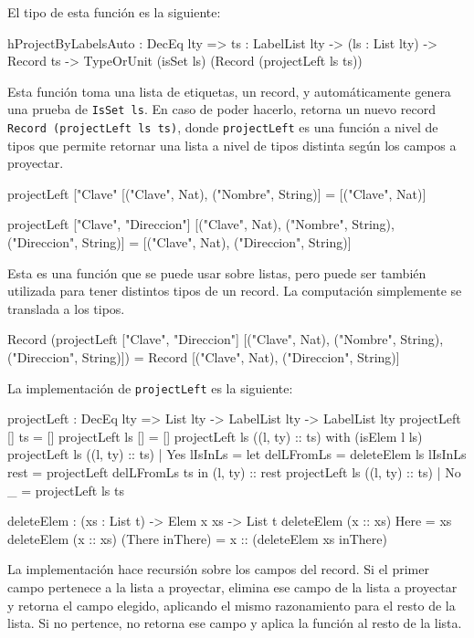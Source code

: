 El tipo de esta función es la siguiente:

\begin{code}
hProjectByLabelsAuto : DecEq lty => {ts : LabelList lty} ->
  (ls : List lty) -> Record ts ->
  TypeOrUnit (isSet ls) (Record (projectLeft ls ts))
\end{code}

Esta función toma una lista de etiquetas, un record, y automáticamente genera una prueba de \texttt{IsSet ls}. En caso de poder hacerlo, retorna un nuevo record \texttt{Record (projectLeft ls ts)}, donde \texttt{projectLeft} es una función a nivel de tipos que permite retornar una lista a nivel de tipos distinta según los campos a proyectar.

\begin{code}
projectLeft ["Clave"
  [("Clave", Nat), ("Nombre", String)] =
  [("Clave", Nat)]

projectLeft ["Clave", "Direccion"]
  [("Clave", Nat), ("Nombre", String), ("Direccion", String)] =
  [("Clave", Nat), ("Direccion", String)]
\end{code}

Esta es una función que se puede usar sobre listas, pero puede ser también utilizada para tener distintos tipos de un record. La computación simplemente se translada a los tipos.

\begin{code}
Record (projectLeft ["Clave", "Direccion"]
  [("Clave", Nat), ("Nombre", String), ("Direccion", String)]) =
Record [("Clave", Nat), ("Direccion", String)]
\end{code}

La implementación de \texttt{projectLeft} es la siguiente:

\begin{code}
projectLeft : DecEq lty => List lty -> LabelList lty ->
  LabelList lty
projectLeft [] ts = []
projectLeft ls [] = []
projectLeft ls ((l, ty) :: ts) with (isElem l ls)
  projectLeft ls ((l, ty) :: ts) | Yes lIsInLs =
    let delLFromLs = deleteElem ls lIsInLs
      rest = projectLeft delLFromLs ts
    in (l, ty) :: rest
  projectLeft ls ((l, ty) :: ts) | No _ = projectLeft ls ts

deleteElem : (xs : List t) -> Elem x xs -> List t
deleteElem (x :: xs) Here = xs
deleteElem (x :: xs) (There inThere) =
  x :: (deleteElem xs inThere)
\end{code}

La implementación hace recursión sobre los campos del record. Si el primer campo pertenece a la lista a proyectar, elimina ese campo de la lista a proyectar y retorna el campo elegido, aplicando el mismo razonamiento para el resto de la lista. Si no pertence, no retorna ese campo y aplica la función al resto de la lista.

